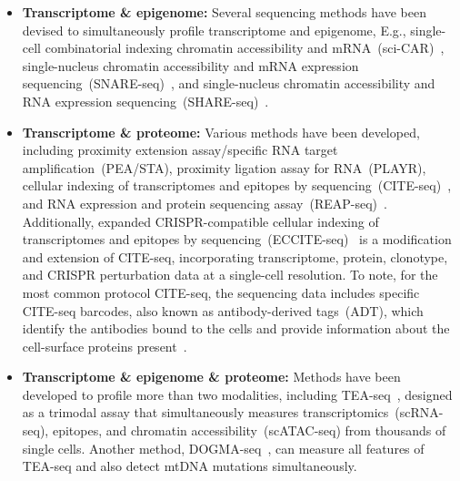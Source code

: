\begin{itemize}
	\item \textbf{Transcriptome \& epigenome:}
	Several sequencing methods have been devised to simultaneously profile transcriptome and epigenome, E.g., single-cell combinatorial indexing chromatin accessibility and mRNA~(sci-CAR)~\citep{cao2018scicar}, single-nucleus chromatin accessibility and mRNA expression sequencing~(SNARE-seq)~\citep{chen2019SNARE}, and single-nucleus chromatin accessibility and RNA expression sequencing~(SHARE-seq)~\citep{ma2020shareseq}.

	\item \textbf{Transcriptome \& proteome:}
	Various methods have been developed, including proximity extension assay/specific RNA target amplification~(PEA/STA), proximity ligation assay for RNA~(PLAYR), cellular indexing of transcriptomes and epitopes by sequencing~(CITE-seq)~\citep{stoeckius2017citeseq}, and RNA expression and protein sequencing assay~(REAP-seq)~\citep{peterson2017reapseq}. Additionally, expanded CRISPR-compatible cellular indexing of transcriptomes and epitopes by sequencing~(ECCITE-seq)~\citep{mimitou2019ECCITE} is a modification and extension of CITE-seq, incorporating transcriptome, protein, clonotype, and CRISPR perturbation data at a single-cell resolution. To note, for the most common protocol CITE-seq, the sequencing data includes specific CITE-seq barcodes, also known as antibody-derived tags~(ADT), which identify the antibodies bound to the cells and provide information about the cell-surface proteins present~\citep{stoeckius2017citeseq}.

	\item \textbf{Transcriptome \& epigenome \& proteome:}
	Methods have been developed to profile more than two modalities, including TEA-seq~\citep{swanson2021simultaneous}, designed as a trimodal assay that simultaneously measures transcriptomics~(scRNA-seq), epitopes, and chromatin accessibility~(scATAC-seq) from thousands of single cells. Another method, DOGMA-seq~\citep{mimitou2021scalable}, can measure all features of TEA-seq and also detect mtDNA mutations simultaneously.

\end{itemize}

